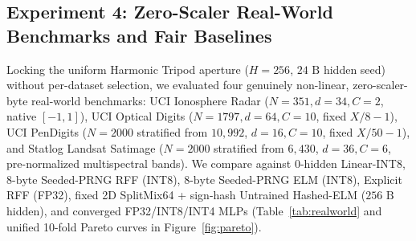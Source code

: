 \subsection{Experiment 4: Zero-Scaler Real-World Benchmarks and Fair Baselines}
\label{sec:exp_real}

Locking the uniform Harmonic Tripod aperture ($H=256$, $24\text{ B}$ hidden seed) without per-dataset selection, we evaluated four genuinely non-linear, zero-scaler-byte real-world benchmarks: UCI Ionosphere Radar ($N=351, d=34, C=2$, native $[-1,1]$), UCI Optical Digits ($N=1797, d=64, C=10$, fixed $X/8-1$), UCI PenDigits ($N=2000$ stratified from $10{,}992$, $d=16, C=10$, fixed $X/50-1$), and Statlog Landsat Satimage ($N=2000$ stratified from $6{,}430$, $d=36, C=6$, pre-normalized multispectral bands). We compare against $0\text{-hidden}$ Linear-INT8, $8\text{-byte}$ Seeded-PRNG RFF (INT8), $8\text{-byte}$ Seeded-PRNG ELM (INT8), Explicit RFF (FP32), fixed 2D SplitMix64 + sign-hash Untrained Hashed-ELM ($256\text{ B}$ hidden), and converged FP32/INT8/INT4 MLPs (Table~\ref{tab:realworld} and unified 10-fold Pareto curves in Figure~\ref{fig:pareto}).

